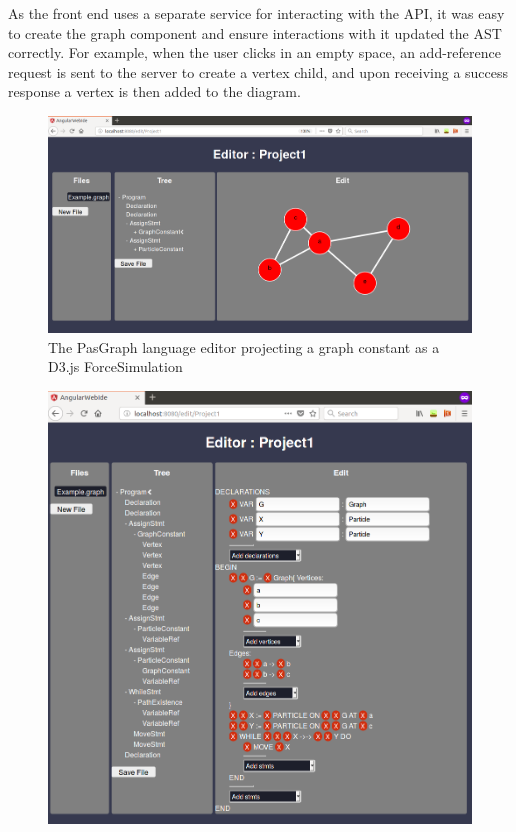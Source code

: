 \documentclass{article}
\begin{document}
{\begin{itemize}
\end{itemize}
As the front end uses a separate service for interacting with the API, it was easy to create the graph component and ensure interactions with it updated the AST correctly. For example, when the user clicks in an empty space, an add-reference request is sent to the server to create a vertex child, and upon receiving a success response a vertex is then added to the diagram.
\begin{figure}[h!]
  \centering
  \includegraphics[width=\linewidth]{./Screenshots/graphUIgraph2narrow.png}
  \caption{The PasGraph language editor projecting a graph constant as a D3.js ForceSimulation}
  \label{fig:pasgraphUI2}
\end{figure}
\begin{figure}[h!]
  \centering
  \includegraphics[width=\linewidth]{./Screenshots/graphUI25Narrow.png}

\end{figure}}
\end{document}
